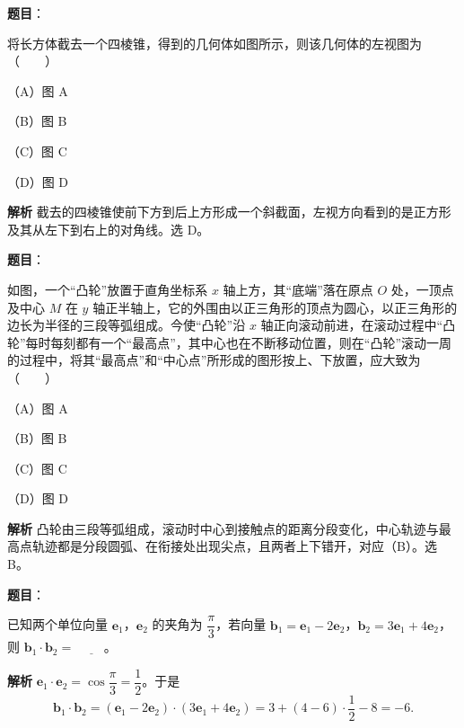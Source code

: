 \begin{answer}

\textbf{题目}：

将长方体截去一个四棱锥，得到的几何体如图所示，则该几何体的左视图为\mbox{（　　）}

（A）图 A

（B）图 B

（C）图 C

（D）图 D
\nopagebreak[4]
\begin{center}\end{center}
\nopagebreak[4]
\textbf{解析}
截去的四棱锥使前下方到后上方形成一个斜截面，左视方向看到的是正方形及其从左下到右上的对角线。选 D。


\end{answer}
\begin{answer}

\textbf{题目}：

如图，一个“凸轮”放置于直角坐标系 $x$ 轴上方，其“底端”落在原点 $O$ 处，一顶点及中心 $M$ 在 $y$ 轴正半轴上，它的外围由以正三角形的顶点为圆心，以正三角形的边长为半径的三段等弧组成。今使“凸轮”沿 $x$ 轴正向滚动前进，在滚动过程中“凸轮”每时每刻都有一个“最高点”，其中心也在不断移动位置，则在“凸轮”滚动一周的过程中，将其“最高点”和“中心点”所形成的图形按上、下放置，应大致为\mbox{（　　）}

（A）图 A

（B）图 B

（C）图 C

（D）图 D
\nopagebreak[4]
\begin{center}\end{center}
\nopagebreak[4]
\textbf{解析}
凸轮由三段等弧组成，滚动时中心到接触点的距离分段变化，中心轨迹与最高点轨迹都是分段圆弧、在衔接处出现尖点，且两者上下错开，对应（B）。选 B。


\end{answer}
\begin{answer}

\textbf{题目}：

已知两个单位向量 $\boldsymbol e_1$，$\boldsymbol e_2$ 的夹角为 $\dfrac\pi3$，若向量 $\boldsymbol b_1=\boldsymbol e_1-2\boldsymbol e_2$，$\boldsymbol b_2=3\boldsymbol e_1+4\boldsymbol e_2$，则 $\boldsymbol b_1\cdot\boldsymbol b_2=$ $\underline{\qquad}$。

\textbf{解析}
$\boldsymbol e_1\cdot\boldsymbol e_2=\cos\dfrac\pi3=\dfrac12$。于是
\nopagebreak[4]
\[\boldsymbol b_1\cdot\boldsymbol b_2=(\boldsymbol e_1-2\boldsymbol e_2)\cdot(3\boldsymbol e_1+4\boldsymbol e_2)
=3+(4-6)\cdot\frac12-8=-6.\]


\end{answer}
